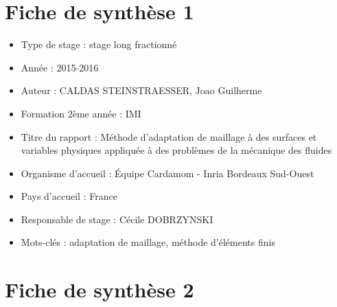\section*{Fiche de synthèse 1}

\begin{itemize}

\item Type de stage : stage long fractionné

\item Année : 2015-2016

\item Auteur : CALDAS STEINSTRAESSER, Joao Guilherme

\item Formation 2ème année : IMI

\item Titre du rapport : Méthode d'adaptation de maillage à des surfaces et variables physiques appliquée à des problèmes de la mécanique des fluides

\item Organisme d’accueil : Équipe Cardamom - Inria Bordeaux Sud-Ouest

\item Pays d’accueil : France

\item Responsable de stage : Cécile DOBRZYNSKI

\item Mots-clés : adaptation de maillage, méthode d'éléments finis

\end{itemize}

\newpage

\section*{Fiche de synthèse 2}

